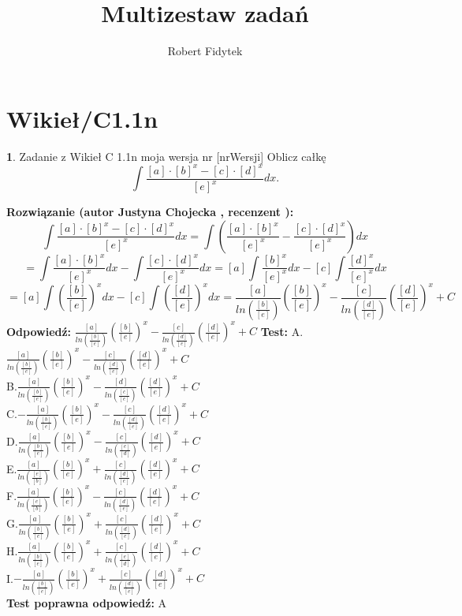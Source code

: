 \documentclass[12pt, a4paper]{article}
\title{Multizestaw zadań}
\author{Robert Fidytek}
\date{}
\theoremstyle{definition} %
\newtheorem{zad}{}
\newcommand{\kategoria}[1]{\section{#1}} %
\newcommand{\zadStart}[1]{\begin{zad}#1\newline} %
\newcommand{\zadStop}{\end{zad}}   %
\newcommand{\rozwStart}[2]{\noindent \textbf{Rozwiązanie (autor #1 , recenzent #2): }\newline} %
\newcommand{\rozwStop}{\newline}                                            %
\newcommand{\odpStart}{\noindent \textbf{Odpowiedź:}\newline}    %
\newcommand{\odpStop}{\newline}                                             %
\newcommand{\testStart}{\noindent \textbf{Test:}\newline} %
\newcommand{\testStop}{\newline} %
\newcommand{\kluczStart}{\noindent \textbf{Test poprawna odpowiedź:}\newline} %
\newcommand{\kluczStop}{\newline} %
\begin{document}
\maketitle
\kategoria{Wikieł/C1.1n}
\zadStart{Zadanie z Wikieł C 1.1n moja wersja nr [nrWersji]}
Oblicz całkę $$\int \frac{[a]\cdot [b]^{x}-[c]\cdot [d]^{x}}{[e]^{x}} dx.$$
\zadStop
\rozwStart{Justyna Chojecka}{}
$$\int \frac{[a]\cdot [b]^{x}-[c]\cdot [d]^{x}}{[e]^{x}} dx=\int\left( \frac{[a]\cdot [b]^{x}}{[e]^{x}}-\frac{[c]\cdot [d]^{x}}{[e]^{x}}\right) dx$$$$=\int\frac{[a]\cdot [b]^{x}}{[e]^{x}}dx-\int \frac{[c]\cdot [d]^{x}}{[e]^{x}} dx=[a] \int\frac{[b]^{x}}{[e]^{x}}dx-[c] \int \frac{[d]^{x}}{[e]^{x}}dx$$$$=[a] \int\left(\frac{[b]}{[e]}\right)^{x}dx-[c] \int\left( \frac{[d]}{[e]}\right)^{x}dx=\frac{[a]}{ln\left(\frac{[b]}{[e]}\right)}\left(\frac{[b]}{[e]}\right)^{x}-\frac{[c]}{ln\left(\frac{[d]}{[e]}\right)}\left(\frac{[d]}{[e]}\right)^{x}+C$$
\rozwStop
\odpStart
$\frac{[a]}{ln\left(\frac{[b]}{[e]}\right)}\left(\frac{[b]}{[e]}\right)^{x}-\frac{[c]}{ln\left(\frac{[d]}{[e]}\right)}\left(\frac{[d]}{[e]}\right)^{x}+C$
\odpStop
\testStart
A.$\frac{[a]}{ln\left(\frac{[b]}{[e]}\right)}\left(\frac{[b]}{[e]}\right)^{x}-\frac{[c]}{ln\left(\frac{[d]}{[e]}\right)}\left(\frac{[d]}{[e]}\right)^{x}+C$\\
B.$\frac{[a]}{ln\left(\frac{[b]}{[e]}\right)}\left(\frac{[b]}{[e]}\right)^{x}-\frac{[d]}{ln\left(\frac{[c]}{[e]}\right)}\left(\frac{[d]}{[e]}\right)^{x}+C$\\
C.$-\frac{[a]}{ln\left(\frac{[b]}{[e]}\right)}\left(\frac{[b]}{[e]}\right)^{x}-\frac{[c]}{ln\left(\frac{[d]}{[e]}\right)}\left(\frac{[d]}{[e]}\right)^{x}+C$\\
D.$\frac{[a]}{ln\left(\frac{[b]}{[e]}\right)}\left(\frac{[b]}{[e]}\right)^{x}-\frac{[c]}{ln\left(\frac{[e]}{[d]}\right)}\left(\frac{[d]}{[e]}\right)^{x}+C$\\
E.$\frac{[a]}{ln\left(\frac{[e]}{[b]}\right)}\left(\frac{[b]}{[e]}\right)^{x}+\frac{[c]}{ln\left(\frac{[d]}{[e]}\right)}\left(\frac{[d]}{[e]}\right)^{x}+C$\\
F.$\frac{[a]}{ln\left(\frac{[e]}{[b]}\right)}\left(\frac{[b]}{[e]}\right)^{x}-\frac{[c]}{ln\left(\frac{[d]}{[e]}\right)}\left(\frac{[d]}{[e]}\right)^{x}+C$\\
G.$\frac{[a]}{ln\left(\frac{[b]}{[e]}\right)}\left(\frac{[b]}{[e]}\right)^{x}+\frac{[c]}{ln\left(\frac{[d]}{[e]}\right)}\left(\frac{[d]}{[e]}\right)^{x}+C$\\
H.$\frac{[a]}{ln\left(\frac{[b]}{[e]}\right)}\left(\frac{[b]}{[e]}\right)^{x}+\frac{[c]}{ln\left(\frac{[e]}{[d]}\right)}\left(\frac{[d]}{[e]}\right)^{x}+C$\\
I.$-\frac{[a]}{ln\left(\frac{[b]}{[e]}\right)}\left(\frac{[b]}{[e]}\right)^{x}+\frac{[c]}{ln\left(\frac{[d]}{[e]}\right)}\left(\frac{[d]}{[e]}\right)^{x}+C$\\
\testStop
\kluczStart
A
\kluczStop
\end{document}

